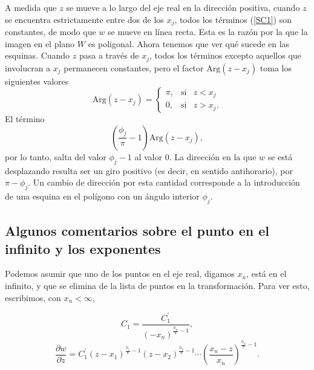 A medida que $z$ se mueve a lo largo del eje real en la dirección positiva, cuando $z$ se encuentra estrictamente entre dos de los $x_j$,  todos los términos (\ref{SC1}) son constantes, de modo que $w$ se mueve en línea recta.
Esta es la razón por la que la imagen en el plano $W$ es poligonal. Ahora tenemos que ver qué sucede en las esquinas. Cuando $z$ pasa a través de $x_j$, todos los términos excepto aquellos que involucran a $x_j$ permanecen constantes, pero el factor $\mbox{Arg}(z-x_j)$ toma los siguientes valores
\[
\mbox{Arg}(z-x_j)=\left\{\begin{array}{ccr}
	\pi, &\mbox{si}&z<x_j\\
	0,&\mbox{si}& z>x_j.
\end{array} \right.
\]
El término 
$$\left(\dfrac{\phi_j}{\pi}-1\right) \mbox{Arg}(z-x_j),$$
por lo tanto, salta del valor $\phi_j-1$ al valor $0$. La dirección en la que $w$ se está desplazando resulta ser un giro positivo (es decir, en sentido antihorario), por $\pi -\phi_j$. Un cambio de dirección por esta cantidad corresponde a la introducción de una esquina en el polígono con un ángulo interior $\phi_j$.\\

\subsection{Algunos comentarios sobre el punto en el infinito y los exponentes}
Podemos asumir que uno de los puntos en el eje real, digamos $x_n$, está en el infinito, y que se elimina de la lista de puntos en la transformación. Para ver esto, escribimos, con $x_n <\infty$,

$$C_1=\dfrac{C_1^{'}}{(-x_n)^{\frac{\phi_n}{\pi}-1}},$$
$$\dfrac{\partial w}{\partial z}=C_1^{'}(z-x_1)^{\frac{\phi_1}{\pi}-1}(z-x_2)^{\frac{\phi_2}{\pi}-1}\cdots\left(\dfrac{x_n-z}{x_n}\right)^{\frac{\phi_n}{\pi}-1}.$$


